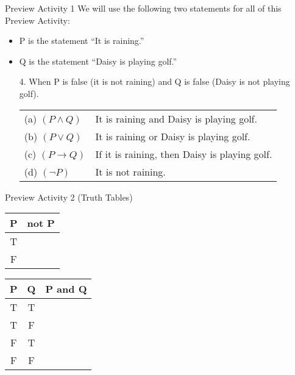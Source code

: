 \documentclass{beamer}
\begin{document}
\begin{frame}{Preview Activity 1}
	We will use the following two statements for all of this Preview Activity:
	\begin{itemize}
		\item P is the statement ``It is raining.''
		\item Q is the statement ``Daisy is playing golf.''
	\end{itemize}
	\begin{enumerate}
		\item[4.]  When P is false (it is not raining) and Q is false (Daisy is not playing golf).\\[.1 in]
		\begin{tabular}{ll}
			(a) $(P \wedge Q)$ & It is raining and Daisy is playing golf.\\[.1 in]
			(b) $(P \vee Q)$ & It is raining or Daisy is playing golf.\\[.1 in]
			(c) $(P \to Q)$ & If it is raining, then Daisy is playing golf.\\[.1 in]
			(d) $(\neg P)$ & It is not raining.
		\end{tabular}
	\end{enumerate}
\end{frame}

\begin{frame}{Preview Activity 2 (Truth Tables)}
	\begin{center} 
	\begin{tabular}{|c|c|}
		\hline
		P & not P\\ \hline
		T & \\ \hline
		F & \\ \hline
	\end{tabular}

	\vspace{.5 in}
	
	\begin{tabular}{|c|c|c|}
		\hline
		P & Q & P and Q\\ \hline
		T & T & \\ \hline
		T & F & \\ \hline
		F & T & \\ \hline
		F & F & \\ \hline
	\end{tabular}
	\end{center}
\end{frame}
\end{document}
